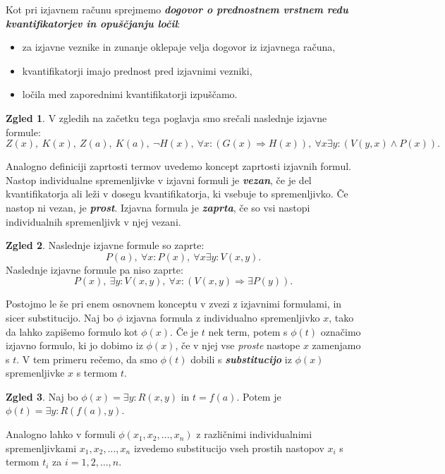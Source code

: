 \documentclass[11pt]{book}
\def\definicija{\color{rdeca}\bf\em}
\theoremstyle{definition}
\theoremstyle{zgled}
\newtheorem*{zgled}{Zgled}
\theoremstyle{odprtproblem}
\theoremstyle{domacanaloga}
\theoremstyle{izrek}
\begin{document}
Kot pri izjavnem računu sprejmemo {\definicija dogovor o prednostnem vrstnem redu kvantifikatorjev in opuščjanju ločil}:
\begin{itemize}
    \item za izjavne veznike in zunanje oklepaje velja dogovor iz izjavnega računa,
    \item kvantifikatorji imajo prednost pred izjavnimi vezniki,
    \item ločila med zaporednimi kvantifikatorji izpuščamo.
\end{itemize}

\begin{zgled}
V zgledih na začetku tega poglavja smo srečali naslednje izjavne formule:
\[
    Z(x), \ K(x), \ Z(a), \ K(a), \ \lnot H(x), \ \forall x \colon (G(x) \Rightarrow H(x)), \ \forall x \exists y \colon (V(y,x) \land P(x)).
\]
\end{zgled}

Analogno definiciji zaprtosti termov uvedemo koncept zaprtosti izjavnih formul. Nastop individualne spremenljivke v izjavni formuli je {\definicija vezan}, če je del kvantifikatorja ali leži v dosegu kvantifikatorja, ki vsebuje to spremenljivko. Če nastop ni vezan, je {\definicija prost}. Izjavna formula je {\definicija zaprta}, če so vsi nastopi individualnih spremenljivk v njej vezani.

\begin{zgled}
Naslednje izjavne formule so zaprte:
\[
    P(a), \ \forall x \colon P(x), \ \forall x \exists y \colon V(x,y).
\]
Naslednje izjavne formule pa niso zaprte:
\[
    P(x), \ \exists y \colon V(x,y), \ \forall x \colon (V(x,y) \Rightarrow \exists P(y)).
\]
\end{zgled}

Postojmo le še pri enem osnovnem konceptu v zvezi z izjavnimi formulami, in sicer substitucijo. Naj bo $\phi$ izjavna formula z individualno spremenljivko $x$, tako da lahko zapišemo formulo kot $\phi(x)$. Če je $t$ nek term, potem s $\phi(t)$ označimo izjavno formulo, ki jo dobimo iz $\phi(x)$, če v njej vse \emph{proste} nastope $x$ zamenjamo s $t$. V tem primeru rečemo, da smo $\phi(t)$ dobili s {\definicija substitucijo} iz $\phi(x)$ spremenljivke $x$ s termom $t$.

\begin{zgled}
Naj bo $\phi(x) = \exists y \colon R(x,y)$ in $t = f(a)$. Potem je $\phi(t) = \exists y \colon R(f(a), y)$.
\end{zgled}

Analogno lahko v formuli $\phi(x_1, x_2, \dots, x_n)$ z različnimi individualnimi spremenljivkami $x_1, x_2, \dots, x_n$ izvedemo substitucijo vseh prostih nastopov $x_i$ s termom $t_i$ za $i = 1,2,\dots,n$.
\end{document}
